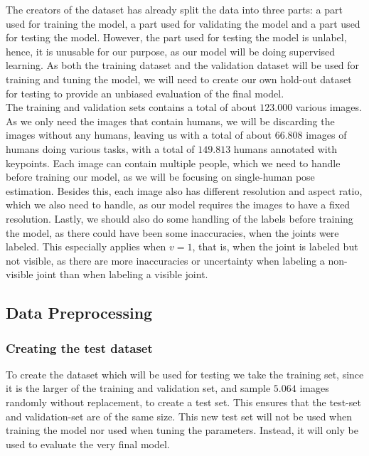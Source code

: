 \documentclass[./main.tex]{subfiles}
\begin{document}
The creators of the dataset has already split the data into three parts: a part used for training the model, a part used for validating the model and a part used for testing the model. However, the part used for testing the model is unlabel, hence, it is unusable for our purpose, as our model will be doing supervised learning. As both the training dataset and the validation dataset will be used for training and tuning the model, we will need to create our own hold-out dataset for testing to provide an unbiased evaluation of the final model. \\
The training and validation sets contains a total of about $123.000$ various images. As we only need the images that contain humans, we will be discarding the images without any humans, leaving us with a total of about $66.808$ images of humans doing various tasks, with a total of $149.813$ humans annotated with keypoints. Each image can contain multiple people, which we need to handle before training our model, as we will be focusing on single-human pose estimation. Besides this, each image also has different resolution and aspect ratio, which we also need to handle, as our model requires the images to have a fixed resolution. Lastly, we should also do some handling of the labels before training the model, as there could have been some inaccuracies, when the joints were labeled. This especially applies when $v = 1$, that is, when the joint is labeled but not visible, as there are more inaccuracies or uncertainty when labeling a non-visible joint than when labeling a visible joint.

\subsection{Data Preprocessing}
\subsubsection{Creating the test dataset}
To create the dataset which will be used for testing we take the training set, since it is the larger of the training and validation set, and sample $5.064$ images randomly without replacement, to create a test set. This ensures that the test-set and validation-set are of the same size. This new test set will not be used when training the model nor used when tuning the parameters. Instead, it will only be used to evaluate the very final model. 
\end{document}
